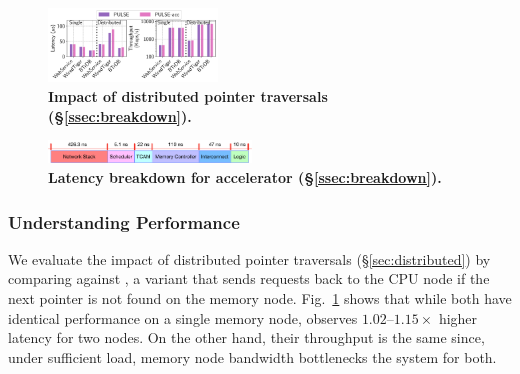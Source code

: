 \begin{figure}[t]
\centering
\includegraphics[width=0.4\textwidth]{fig/pulse/breakdown.pdf}%
\vspace{-1em}
\caption[Impact of distributed pointer traversals]{\textbf{Impact of distributed pointer traversals (\S\ref{ssec:breakdown}).}}
\label{fig:eval_breakdown}
\end{figure}

\begin{figure}[t]
  \centering	
  \includegraphics[width=0.48\textwidth]{fig/pulse/breakdown_latency_new.pdf}
  \vspace{-1em}
  \caption[Latency breakdown for \pulse accelerator ]{\textbf{Latency breakdown for \pulse accelerator (\S\ref{ssec:breakdown}).}}
  \label{fig:eval_breakdown_latency_}%
\end{figure}




\subsubsection{Understanding \pulse Performance}
\label{sssec:breakdown}




 We evaluate the impact of distributed pointer traversals (\S\ref{sec:distributed}) by comparing \pulse against \pulseacc, a \pulse variant that sends requests back to the CPU node if the next pointer is not found on the memory node. Fig.~\ref{fig:eval_breakdown} shows that while both have identical performance on a single memory node, \pulseacc observes $1.02$--$1.15\times$ higher latency for two nodes. On the other hand, their throughput is the same since, under sufficient load, memory node bandwidth bottlenecks the system for both.





